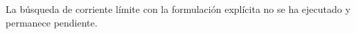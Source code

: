 ﻿La búsqueda de corriente límite con la formulación explícita no se ha ejecutado y permanece pendiente.
